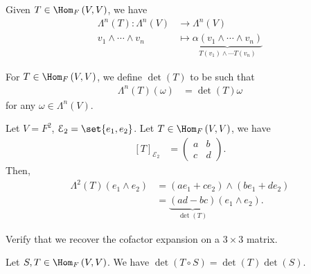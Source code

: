\documentclass[10pt]{mypackage}
\begin{document}
    Given $T\in \Hom_{F}\left(V,V\right)$, we have 
    \begin{align*}
      \Lambda^{n}\left(T\right):\Lambda^{n}\left(V\right)&\rightarrow \Lambda^{n}\left(V\right)\\
      v_1\wedge\cdots\wedge v_n &\mapsto \underbrace{\alpha \left(v_1\wedge\cdots\wedge v_n\right)}_{T\left(v_1\right)\wedge\cdots T\left(v_n\right)}
    \end{align*}
    \begin{definition}
      For $T\in \Hom_{F}\left(V,V\right)$, we define $\det(T)$ to be such that
      \begin{align*}
        \Lambda^{n}\left(T\right)\left(\omega\right) &= \det(T) \omega
      \end{align*}
      for any $\omega\in \Lambda^{n}\left(V\right)$.
    \end{definition}
    \begin{example}
      Let $V = F^2$, $\mathcal{E}_2 = \set{e_1,e_2}$. Let $T\in \Hom_{F}\left(V,V\right)$, we have
      \begin{align*}
        \left[T\right]_{\mathcal{E}_2} &= \begin{pmatrix}a & b \\ c & d\end{pmatrix}.
      \end{align*}
      Then,
      \begin{align*}
        \Lambda^{2}\left(T\right)\left(e_1\wedge e_2\right) &= \left(ae_1 + ce_2\right)\wedge \left(be_1 + de_2\right)\\
                                                            &= \underbrace{\left(ad-bc\right)}_{\det(T)}\left(e_1\wedge e_2\right).
      \end{align*}
    \end{example}
    \begin{exercise}
      Verify that we recover the cofactor expansion on a $3\times 3$ matrix.
    \end{exercise}
    \begin{lemma}
      Let $S,T\in \Hom_{F}\left(V,V\right)$. We have $\det\left(T\circ S\right) = \det(T)\det(S)$.
    \end{lemma}
\end{document}
